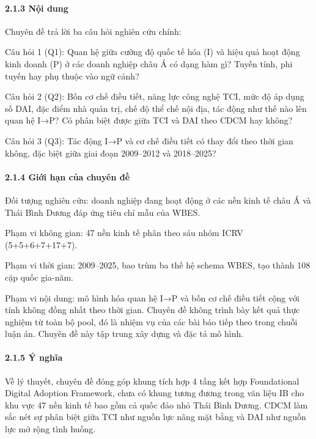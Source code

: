 \documentclass[12pt,a4paper]{article}
\begin{document}
\hypertarget{213-nux1ed9i-dung}{%
\paragraph{2.1.3 Nội dung}\label{213-nux1ed9i-dung}}

Chuyên đề trả lời ba câu hỏi nghiên cứu chính:

Câu hỏi 1 (Q1): Quan hệ giữa cường độ quốc tế hóa (I) và hiệu quả hoạt
động kinh doanh (P) ở các doanh nghiệp châu Á có dạng hàm gì? Tuyến
tính, phi tuyến hay phụ thuộc vào ngữ cảnh?

Câu hỏi 2 (Q2): Bốn cơ chế điều tiết, năng lực công nghệ TCI, mức độ áp
dụng số DAI, đặc điểm nhà quản trị, chế độ thể chế nội địa, tác động như
thế nào lên quan hệ I→P? Có phân biệt được giữa TCI và DAI theo CDCM hay
không?

Câu hỏi 3 (Q3): Tác động I→P và cơ chế điều tiết có thay đổi theo thời
gian không, đặc biệt giữa giai đoạn 2009--2012 và 2018--2025?

\hypertarget{214-giux1edbi-hux1ea1n-cux1ee7a-chuyuxean-ux111ux1ec1}{%
\paragraph{2.1.4 Giới hạn của chuyên
đề}\label{214-giux1edbi-hux1ea1n-cux1ee7a-chuyuxean-ux111ux1ec1}}

Đối tượng nghiên cứu: doanh nghiệp đang hoạt động ở các nền kinh tế châu
Á và Thái Bình Dương đáp ứng tiêu chí mẫu của WBES.

Phạm vi không gian: 47 nền kinh tế phân theo sáu nhóm ICRV
(5+5+6+7+17+7).

Phạm vi thời gian: 2009--2025, bao trùm ba thế hệ schema WBES, tạo thành
108 cặp quốc gia-năm.

Phạm vi nội dung: mô hình hóa quan hệ I→P và bốn cơ chế điều tiết cộng
với tính không đồng nhất theo thời gian. Chuyên đề không trình bày kết
quả thực nghiệm từ toàn bộ pool, đó là nhiệm vụ của các bài báo tiếp
theo trong chuỗi luận án. Chuyên đề này tập trung xây dựng và đặc tả mô
hình.

\hypertarget{215-uxfd-nghux129a}{%
\paragraph{2.1.5 Ý nghĩa}\label{215-uxfd-nghux129a}}

Về lý thuyết, chuyên đề đóng góp khung tích hợp 4 tầng kết hợp
Foundational Digital Adoption Framework, chưa có khung tương đương trong
văn liệu IB cho khu vực 47 nền kinh tế bao gồm cả quốc đảo nhỏ Thái Bình
Dương. CDCM làm sắc nét sự phân biệt giữa TCI như nguồn lực nâng mặt
bằng và DAI như nguồn lực mở rộng tình huống.
\end{document}
